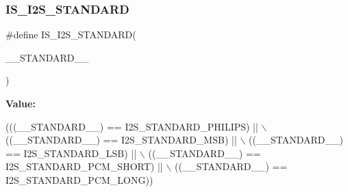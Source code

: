 \subsubsection{\texorpdfstring{I\+S\+\_\+\+I2\+S\+\_\+\+S\+T\+A\+N\+D\+A\+RD}{IS\_I2S\_STANDARD}}
{\footnotesize\ttfamily \#define I\+S\+\_\+\+I2\+S\+\_\+\+S\+T\+A\+N\+D\+A\+RD(\begin{DoxyParamCaption}\item[{}]{\+\_\+\+\_\+\+S\+T\+A\+N\+D\+A\+R\+D\+\_\+\+\_\+ }\end{DoxyParamCaption})}

{\bfseries Value\+:}
\begin{DoxyCode}
(((\_\_STANDARD\_\_) == I2S\_STANDARD\_PHILIPS)   || \(\backslash\)
                                       ((\_\_STANDARD\_\_) == I2S\_STANDARD\_MSB)       || \(\backslash\)
                                       ((\_\_STANDARD\_\_) == I2S\_STANDARD\_LSB)       || \(\backslash\)
                                       ((\_\_STANDARD\_\_) == I2S\_STANDARD\_PCM\_SHORT) || \(\backslash\)
                                       ((\_\_STANDARD\_\_) == I2S\_STANDARD\_PCM\_LONG))
\end{DoxyCode}
